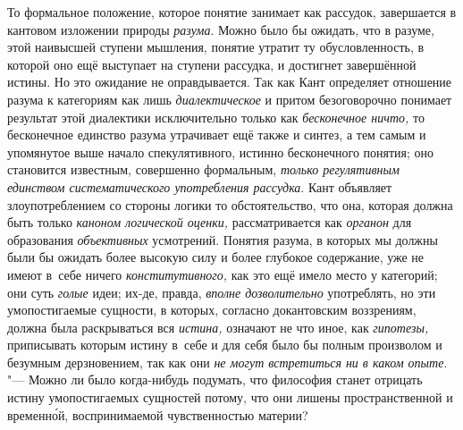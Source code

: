 То формальное положение, которое понятие занимает как
рассудок, завершается в кантовом изложении природы
{\em разума}. Можно было
бы ожидать, что в разуме, этой наивысшей ступени мышления, понятие утратит
ту обусловленность, в которой оно ещё выступает на ступени рассудка, и
достигнет завершённой истины. Но это ожидание не оправдывается. Так как
Кант определяет отношение разума к категориям как лишь
{\em диалектическое} и
притом безоговорочно понимает результат этой диалектики исключительно
только как {\em бесконечное ничто,}
то бесконечное единство разума утрачивает ещё
также и синтез, а тем самым и упомянутое выше начало
спекулятивного, истинно бесконечного понятия; оно становится известным,
совершенно формальным, {\em только
регулятивным единством систематического употребления рассудка}.
Кант объявляет злоупотреблением со стороны логики то
обстоятельство, что она, которая должна быть только
{\em каноном логической оценки,}
рассматривается как
{\em органон} для
образования {\em объективных}
усмотрений. Понятия разума, в которых мы должны были бы
ожидать более высокую силу и более глубокое содержание, уже не имеют в~себе
ничего {\em конститутивного,}
как это ещё имело место у категорий; они суть
{\em голые} идеи; их-де,
правда, {\em вполне дозволительно}
употреблять, но эти умопостигаемые сущности, в которых,
согласно докантовским воззрениям, должна была раскрываться вся
{\em истина,} означают не
что иное, как {\em гипотезы,}
приписывать которым истину в~себе и для себя было бы полным
произволом и безумным дерзновением, так как они
{\em не могут встретиться ни в каком
опыте}. "--- Можно ли было когда-нибудь подумать, что философия
станет отрицать истину умопостигаемых сущностей потому, что они лишены
пространственной и временн\'{о}й, воспринимаемой чувственностью материи?


